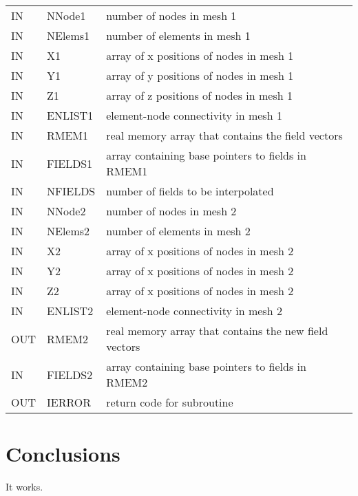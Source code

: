\documentclass[a4paper]{article}
\begin{document}
\vspace{5mm}

\begin{supertabular}{lll}
IN  & NNode1   & number of nodes in mesh 1\\ 
IN  & NElems1  & number of elements in mesh 1\\ 
IN  & X1       & array of x positions of nodes in mesh 1\\ 
IN  & Y1       & array of y positions of nodes in mesh 1\\ 
IN  & Z1       & array of z positions of nodes in mesh 1\\ 
IN  & ENLIST1  & element-node connectivity in mesh 1\\ 
IN  & RMEM1    & real memory array that contains the field vectors\\
IN  & FIELDS1  & array containing base pointers to fields in RMEM1\\ 
IN  & NFIELDS  & number of fields to be interpolated\\ 
IN  & NNode2   & number of nodes in mesh 2\\ 
IN  & NElems2  & number of elements in mesh 2\\ 
IN  & X2       & array of x positions of nodes in mesh 2\\ 
IN  & Y2       & array of x positions of nodes in mesh 2\\ 
IN  & Z2       & array of x positions of nodes in mesh 2\\ 
IN  & ENLIST2  & element-node connectivity in mesh 2\\ 
OUT & RMEM2    & real memory array that contains the new field vectors\\
IN  & FIELDS2  & array containing base pointers to fields in RMEM2\\ 
OUT & IERROR   & return code for subroutine\\
\end{supertabular}

\section{Conclusions}
It works.

 

\end{document}
